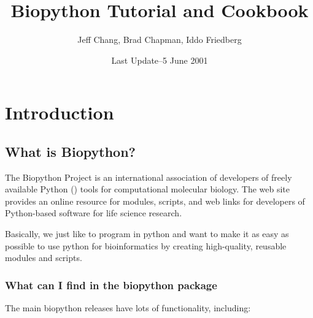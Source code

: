 \documentclass{report}
\begin{document}
\title{Biopython Tutorial and Cookbook}
\author{Jeff Chang, Brad Chapman, Iddo Friedberg}
\date{Last Update--5 June 2001}

\maketitle
\tableofcontents

\chapter{Introduction}

\section{What is Biopython?}

The Biopython Project is an international association of developers of freely available Python () tools for computational molecular biology. The web site  provides an online resource for modules, scripts, and web links for developers of Python-based software for life science research.


Basically, we just like to program in python and want to make it as easy as possible to use python for bioinformatics by creating high-quality, reusable modules and scripts.

\subsection{What can I find in the biopython package}

The main biopython releases have lots of functionality, including:
\end{document}
